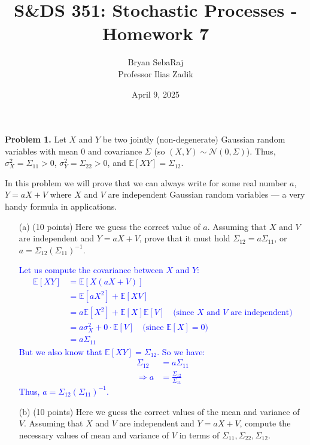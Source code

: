 \documentclass{article}
\title{S\&DS 351: Stochastic Processes - Homework 7}
\author{Bryan SebaRaj \\[0.8em] Professor Ilias Zadik}
\date{April 9, 2025}
\begin{document}
\maketitle


\textbf{Problem 1.} Let $X$ and $Y$ be two jointly (non-degenerate) Gaussian random variables with mean 0 and covariance $\Sigma$ (so $(X, Y) \sim \mathcal{N}(0, \Sigma)$). Thus, $\sigma_X^2 = \Sigma_{11} > 0$, $\sigma_Y^2 = \Sigma_{22} > 0$, and $\mathbb{E}[XY] = \Sigma_{12}$.

In this problem we will prove that we can always write for some real number $a$, $Y = aX + V$ where $X$ and $V$ are independent Gaussian random variables --- a very handy formula in applications.

\begin{enumerate}
    \item[(a)] (10 points) Here we guess the correct value of $a$. Assuming that $X$ and $V$ are independent and $Y = aX + V$, prove that it must hold $\Sigma_{12} = a\Sigma_{11}$, or $a = \Sigma_{12}(\Sigma_{11})^{-1}$.

        \textcolor{blue}{
Let us compute the covariance between $X$ and $Y$:
\begin{align}
\mathbb{E}[XY] &= \mathbb{E}[X(aX + V)]\\
&= \mathbb{E}[aX^2] + \mathbb{E}[XV]\\
&= a\mathbb{E}[X^2] + \mathbb{E}[X]\mathbb{E}[V] \quad \text{(since $X$ and $V$ are independent)}\\
&= a\sigma_X^2 + 0 \cdot \mathbb{E}[V] \quad \text{(since $\mathbb{E}[X] = 0$)}\\
&= a \Sigma_{11}
\end{align}
But we also know that $\mathbb{E}[XY] = \Sigma_{12}$. So we have:
\begin{align}
\Sigma_{12} &= a\Sigma_{11}\\
\Rightarrow a &= \frac{\Sigma_{12}}{\Sigma_{11}}
\end{align}
Thus, $a = \Sigma_{12}(\Sigma_{11})^{-1}$.
        }
    
    \item[(b)] (10 points) Here we guess the correct values of the mean and variance of $V$. Assuming that $X$ and $V$ are independent and $Y = aX + V$, compute the necessary values of mean and variance of $V$ in terms of $\Sigma_{11}, \Sigma_{22}, \Sigma_{12}$.


\end{enumerate}
\end{document}
